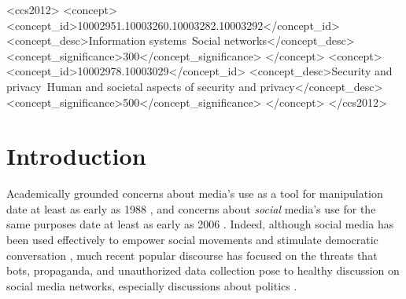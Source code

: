 \documentclass[sigconf,authordraft]{acmart}
\begin{document}

\begin{CCSXML}
<ccs2012>
   <concept>
       <concept_id>10002951.10003260.10003282.10003292</concept_id>
       <concept_desc>Information systems~Social networks</concept_desc>
       <concept_significance>300</concept_significance>
       </concept>
   <concept>
       <concept_id>10002978.10003029</concept_id>
       <concept_desc>Security and privacy~Human and societal aspects of security and privacy</concept_desc>
       <concept_significance>500</concept_significance>
       </concept>
 </ccs2012>
\end{CCSXML}






\maketitle

\section{Introduction}



Academically grounded concerns about media's use as a tool for manipulation date at least as early as 1988 \cite{herman2010manufacturing}, and concerns about {\itshape social} media's use for the same purposes date at least as early as 2006 \cite{howard2006new}. Indeed, although social media has been used effectively to empower social movements and stimulate democratic conversation \cite{conover2013digital, gonzalez2011dynamics, varol2014evolution}, much recent popular discourse has focused on the threats that bots, propaganda, and unauthorized data collection pose to healthy discussion on social media networks, especially discussions about politics \cite{BBC_news_chatbot,BBC_news_fakenews,NYT_opinion_chatbot,CambridgeAnalyticaNYT}.
\end{document}
